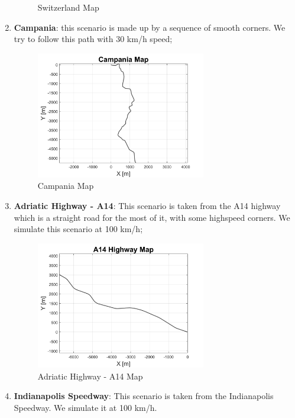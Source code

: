 \begin{enumerate}
\begin{figure}[H]
    \caption{Switzerland Map}
      \label{fig:SwitzerlandMap}
\end{figure}
\vspace{1cm}
    \item \textbf{Campania}: this scenario is made up by a sequence of smooth corners. We try to follow this path with 30 km/h speed;
     \begin{figure}[H]
    \centering
    \includegraphics[width=0.7\textwidth]{Figures/CampaniaMap.png}
    \caption{Campania Map}
      \label{fig:Campania}
\end{figure}
\pagebreak
    \item \textbf{Adriatic Highway - A14}: This scenario is taken from the A14 highway which is a straight road for the most of it, with some highspeed corners. We simulate this scenario at 100 km/h;
     \begin{figure}[H]
    \centering
    \includegraphics[width=0.7\textwidth]{Figures/A14Map.png}
    \caption{Adriatic Highway - A14 Map}
      \label{fig:A14Map}
\end{figure}
\vspace{1cm}
    \item \textbf{Indianapolis Speedway}: This scenario is taken from the Indianapolis Speedway. We simulate it at 100 km/h.

\end{enumerate}
